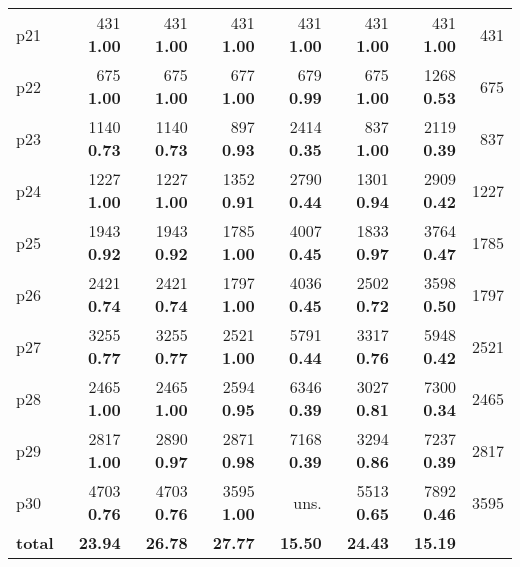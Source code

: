 \begin{tabular}{|l|rrrrrr|r|}
p21 & {\footnotesize 431} \textbf{1.00} & {\footnotesize 431} \textbf{1.00} & {\footnotesize 431} \textbf{1.00} & {\footnotesize 431} \textbf{1.00} & {\footnotesize 431} \textbf{1.00} & {\footnotesize 431} \textbf{1.00} & 431\\
p22 & {\footnotesize 675} \textbf{1.00} & {\footnotesize 675} \textbf{1.00} & {\footnotesize 677} \textbf{1.00} & {\footnotesize 679} \textbf{0.99} & {\footnotesize 675} \textbf{1.00} & {\footnotesize 1268} \textbf{0.53} & 675\\
p23 & {\footnotesize 1140} \textbf{0.73} & {\footnotesize 1140} \textbf{0.73} & {\footnotesize 897} \textbf{0.93} & {\footnotesize 2414} \textbf{0.35} & {\footnotesize 837} \textbf{1.00} & {\footnotesize 2119} \textbf{0.39} & 837\\
p24 & {\footnotesize 1227} \textbf{1.00} & {\footnotesize 1227} \textbf{1.00} & {\footnotesize 1352} \textbf{0.91} & {\footnotesize 2790} \textbf{0.44} & {\footnotesize 1301} \textbf{0.94} & {\footnotesize 2909} \textbf{0.42} & 1227\\
p25 & {\footnotesize 1943} \textbf{0.92} & {\footnotesize 1943} \textbf{0.92} & {\footnotesize 1785} \textbf{1.00} & {\footnotesize 4007} \textbf{0.45} & {\footnotesize 1833} \textbf{0.97} & {\footnotesize 3764} \textbf{0.47} & 1785\\
p26 & {\footnotesize 2421} \textbf{0.74} & {\footnotesize 2421} \textbf{0.74} & {\footnotesize 1797} \textbf{1.00} & {\footnotesize 4036} \textbf{0.45} & {\footnotesize 2502} \textbf{0.72} & {\footnotesize 3598} \textbf{0.50} & 1797\\
p27 & {\footnotesize 3255} \textbf{0.77} & {\footnotesize 3255} \textbf{0.77} & {\footnotesize 2521} \textbf{1.00} & {\footnotesize 5791} \textbf{0.44} & {\footnotesize 3317} \textbf{0.76} & {\footnotesize 5948} \textbf{0.42} & 2521\\
p28 & {\footnotesize 2465} \textbf{1.00} & {\footnotesize 2465} \textbf{1.00} & {\footnotesize 2594} \textbf{0.95} & {\footnotesize 6346} \textbf{0.39} & {\footnotesize 3027} \textbf{0.81} & {\footnotesize 7300} \textbf{0.34} & 2465\\
p29 & {\footnotesize 2817} \textbf{1.00} & {\footnotesize 2890} \textbf{0.97} & {\footnotesize 2871} \textbf{0.98} & {\footnotesize 7168} \textbf{0.39} & {\footnotesize 3294} \textbf{0.86} & {\footnotesize 7237} \textbf{0.39} & 2817\\
p30 & {\footnotesize 4703} \textbf{0.76} & {\footnotesize 4703} \textbf{0.76} & {\footnotesize 3595} \textbf{1.00} & uns. & {\footnotesize 5513} \textbf{0.65} & {\footnotesize 7892} \textbf{0.46} & 3595\\
\hline
\textbf{total} & \textbf{23.94} & \textbf{26.78} & \textbf{27.77} & \textbf{15.50} & \textbf{24.43} & \textbf{15.19} & \\
\hline
\end{tabular}

